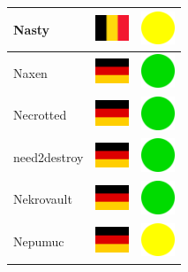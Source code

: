 \documentclass[12pt, a4paper, twoside]{report}
\begin{document}
\begin{center}
\begin{longtable}{|p{5cm}|p{2cm}|p{2cm}|}
Nasty & \includegraphics[width=1cm]{4x3/be} & \includegraphics[width=1cm]{likes/m} \\ \hline
Naxen & \includegraphics[width=1cm]{4x3/de} & \includegraphics[width=1cm]{likes/y} \\ \hline
Necrotted & \includegraphics[width=1cm]{4x3/de} & \includegraphics[width=1cm]{likes/y} \\ \hline
need2destroy & \includegraphics[width=1cm]{4x3/de} & \includegraphics[width=1cm]{likes/y} \\ \hline
Nekrovault & \includegraphics[width=1cm]{4x3/de} & \includegraphics[width=1cm]{likes/y} \\ \hline
Nepumuc & \includegraphics[width=1cm]{4x3/de} & \includegraphics[width=1cm]{likes/m} \\ \hline

\end{longtable}
\end{center}
\end{document}
